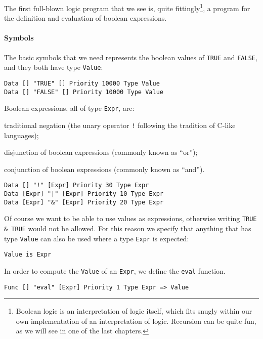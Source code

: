 The first full-blown logic program that we see is, quite fittingly\footnote{Boolean logic is an interpretation of logic itself, which fits snugly within our own implementation of an interpretation of logic. Recursion can be quite fun, as we will see in one of the last chapters.}, a program for the definition and evaluation of boolean expressions.

\paragraph{Symbols}
The basic symbols that we need represents the boolean values of \texttt{TRUE} and \texttt{FALSE}, and they both have type \texttt{Value}:

\begin{lstlisting}
Data [] "TRUE" [] Priority 10000 Type Value
Data [] "FALSE" [] Priority 10000 Type Value
\end{lstlisting}

Boolean expressions, all of type \texttt{Expr}, are: 
\begin{inparaenum}
\item traditional negation (the unary operator \texttt{!} following the tradition of C-like languages);
\item disjunction of boolean expressions (commonly known as ``or'');
\item conjunction of boolean expressions (commonly known as ``and'').
\end{inparaenum}

\begin{lstlisting}
Data [] "!" [Expr] Priority 30 Type Expr
Data [Expr] "|" [Expr] Priority 10 Type Expr
Data [Expr] "&" [Expr] Priority 20 Type Expr
\end{lstlisting}

Of course we want to be able to use values as expressions, otherwise writing \texttt{TRUE \& TRUE} would not be allowed. For this reason we specify that anything that has type \texttt{Value} can also be used where a type \texttt{Expr} is expected:

\begin{lstlisting}
Value is Expr
\end{lstlisting}

In order to compute the \texttt{Value} of an \texttt{Expr}, we define the \texttt{eval} function.

\begin{lstlisting}
Func [] "eval" [Expr] Priority 1 Type Expr => Value
\end{lstlisting}

